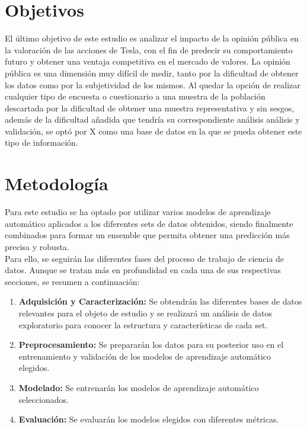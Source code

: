 \documentclass[a4paper, 12pt]{report}
\begin{document}
        \section{Objetivos}

                
                El último objetivo de este estudio es analizar el impacto de la opinión pública en la valoración de las acciones de Tesla, 
                con el fin de predecir su comportamiento futuro y obtener una ventaja competitiva en el mercado de valores. La opinión pública es una dimensión muy difícil de medir,
                tanto por la dificultad de obtener los datos como por la subjetividad de los mismos. Al quedar la opción de realizar cualquier tipo de encuesta o cuestionario a una 
                muestra de la población descartada por la dificultad de obtener una muestra representativa y sin sesgos, además de la dificultad añadida que tendría su correspondiente análisis 
                análisis y validación, se optó por X como una base de datos en la que se pueda obtener este tipo de información.\\

        \section{Metodología}

                Para este estudio se ha optado por utilizar varios modelos de aprendizaje automático aplicados a los diferentes sets de datos obtenidos,
                siendo finalmente combinados para formar un ensemble que permita obtener una predicción más precisa y robusta.\\

                Para ello, se seguirán las diferentes fases del proceso de trabajo de ciencia de datos. Aunque se tratan más en profundidad en cada una de sus respectivas secciones,
                se resumen a continuación:

                \begin{enumerate}
                        \item \textbf{Adquisición y Caracterización:} Se obtendrán las diferentes bases de datos relevantes para el objeto de estudio y se realizará 
                        un análisis de datos exploratorio para conocer la estructura y características de cada set.
                        \item \textbf{Preprocesamiento:} Se prepararán los datos para su posterior uso en el entrenamiento y validación de los modelos de aprendizaje automático elegidos.
                        \item \textbf{Modelado:} Se entrenarán los modelos de aprendizaje automático seleccionados.
                        \item \textbf{Evaluación:} Se evaluarán los modelos elegidos con diferentes métricas.
                \end{enumerate}
\end{document}
